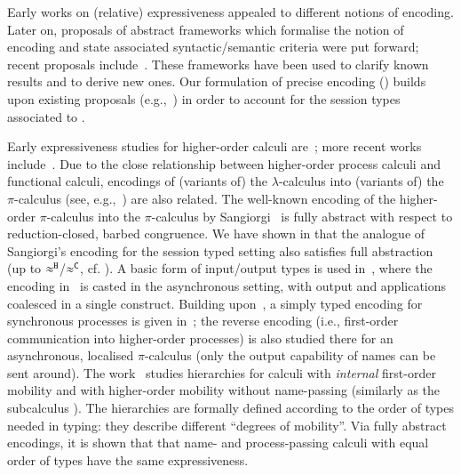 \documentclass[runningheads]{llncs}
\begin{document}
{Early works on (relative) expressiveness appealed to different notions of encoding.
Later on, 
proposals of abstract 
frameworks which formalise the notion of encoding 
and state associated syntactic/semantic criteria 
were put forward; 
recent proposals include~\cite{DBLP:journals/iandc/Gorla10,DBLP:journals/tcs/FuL10,DBLP:journals/corr/abs-1208-2750,DBLP:conf/esop/PetersNG13,DBLP:journals/corr/PetersG15}. 
These frameworks %
have been used to clarify known results and to derive new ones.
Our formulation of precise encoding () 
builds upon existing proposals (e.g.,~\cite{Palamidessi03,DBLP:journals/iandc/Gorla10,DBLP:conf/icalp/LanesePSS10})
in order to account for the session types
associated to \HOp. %


Early expressiveness studies for higher-order calculi are~\cite{Tho90,SangiorgiD:expmpa}; 
more recent works include~\cite{BundgaardHG06,DBLP:conf/icalp/LanesePSS10,DBLP:journals/iandc/LanesePSS11,XuActa2012,DBLP:conf/wsfm/XuYL13}.
Due to the close relationship between higher-order process calculi and functional calculi, 
encodings of (variants of) the $\lambda$-calculus into (variants of) the $\pi$-calculus (see, e.g.,~\cite{San92,DBLP:journals/tcs/Fu99,DBLP:journals/iandc/YoshidaBH04,BHY,DBLP:conf/concur/SangiorgiX14}) are also related.
The well-known encoding of the higher-order $\pi$-calculus
into the  $\pi$-calculus 
by Sangiorgi~\cite{SangiorgiD:expmpa} 
is fully abstract with respect to reduction-closed, barbed congruence. 
We have shown in  that the analogue of Sangiorgi's encoding for the session typed setting also satisfies full abstraction (up to $\approx^\mathtt{H}$/$\approx^\mathtt{C}$, cf. ).
A basic form of input/output types is used in~\cite{DBLP:journals/tcs/Sangiorgi01}, where the encoding in~\cite{SangiorgiD:expmpa} is casted in the asynchronous setting, with output and applications coalesced in a single construct. Building upon~\cite{DBLP:journals/tcs/Sangiorgi01}, 
a simply typed encoding for synchronous processes is given in~\cite{SaWabook}; the reverse encoding (i.e.,  first-order communication into higher-order processes) is also studied there for an asynchronous, localised $\pi$-calculus (only the output capability of names can be sent around).
The work~\cite{San96int} studies hierarchies for calculi with \emph{internal} first-order mobility and 
with higher-order mobility without name-passing (similarly as the subcalculus \HO). 
The hierarchies are %
formally defined according to the order of types needed in typing:
they describe different ``degrees of mobility''.
Via fully abstract encodings, it is shown that that name- and process-passing calculi with equal order of types have the same expressiveness.

}
\end{document}
